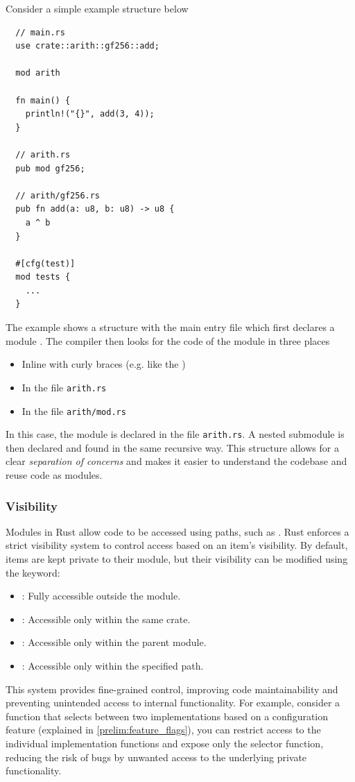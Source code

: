 \documentclass[11pt]{report}
\theoremstyle{definition}
\theoremstyle{plain}
\begin{document}
Consider a simple example structure below

\begin{verbatim}
  // main.rs
  use crate::arith::gf256::add;

  mod arith

  fn main() {
    println!("{}", add(3, 4));
  }

  // arith.rs
  pub mod gf256;

  // arith/gf256.rs
  pub fn add(a: u8, b: u8) -> u8 {
    a ^ b
  }

  #[cfg(test)]
  mod tests {
    ...
  }
\end{verbatim}

The example shows a structure with the main entry file which first declares a module . The compiler then looks for the code of the module in three places
\begin{itemize}[parsep=0pt, itemsep=0pt]
  \item Inline with curly braces (e.g. like the )
  \item In the file \texttt{arith.rs}
  \item In the file \texttt{arith/mod.rs}
\end{itemize}
In this case, the module  is declared in the file \texttt{arith.rs}. A nested submodule  is then declared and found in the same recursive way. This structure allows for a clear \textit{separation of concerns} and makes it easier to understand the codebase and reuse code as modules.

\subsubsection{Visibility}
Modules in Rust allow code to be accessed using paths, such as . Rust enforces a strict visibility system to control access based on an item's visibility. By default, items are kept private to their module, but their visibility can be modified using the  keyword:
\begin{itemize}[parsep=0pt, itemsep=0pt]
  \item {}: Fully accessible outside the module.
  \item {}: Accessible only within the same crate.
  \item {}: Accessible only within the parent module.
  \item {}: Accessible only within the specified path.
\end{itemize}
This system provides fine-grained control, improving code maintainability and preventing unintended access to internal functionality. For example, consider a function that selects between two implementations based on a configuration feature (explained in \autoref{prelim:feature_flags}), you can restrict access to the individual implementation functions and expose only the selector function, reducing the risk of bugs by unwanted access to the underlying private functionality.
\end{document}
